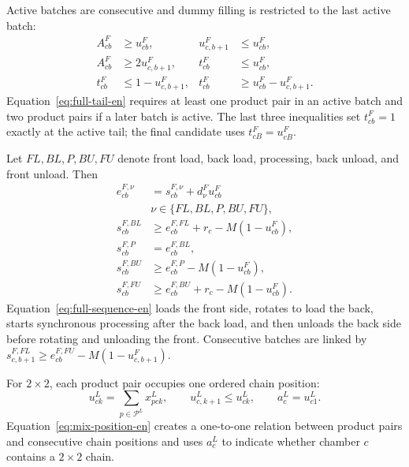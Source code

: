 \documentclass[journal]{IEEEtran}
\begin{document}
Active batches are consecutive and dummy filling is restricted to the last active batch:
\begin{equation}
\begin{aligned}
A^F_{cb}&\ge u^F_{cb}, &u^F_{c,b+1}&\le u^F_{cb},\\
A^F_{cb}&\ge2u^F_{c,b+1},
&t^F_{cb}&\le u^F_{cb},\\
t^F_{cb}&\le1-u^F_{c,b+1},
&t^F_{cb}&\ge u^F_{cb}-u^F_{c,b+1}.
\end{aligned}
\label{eq:full-tail-en}
\end{equation}
Equation~\eqref{eq:full-tail-en} requires at least one product pair in an active batch and two product pairs if a later batch is active. The last three inequalities set $t^F_{cb}=1$ exactly at the active tail; the final candidate uses $t^F_{cB}=u^F_{cB}$.

Let $FL,BL,P,BU,FU$ denote front load, back load, processing, back unload, and front unload. Then
\begin{equation}
\begin{aligned}
e^{F,\nu}_{cb}&=s^{F,\nu}_{cb}+d^{F}_{\nu}u^F_{cb}
\\[-1pt]&\nu\in\{FL,BL,P,BU,FU\},\\
s^{F,BL}_{cb}&\ge e^{F,FL}_{cb}+r_c-M(1-u^F_{cb}),\\
s^{F,P}_{cb}&=e^{F,BL}_{cb},\\
s^{F,BU}_{cb}&\ge e^{F,P}_{cb}-M(1-u^F_{cb}),\\
s^{F,FU}_{cb}&\ge e^{F,BU}_{cb}+r_c-M(1-u^F_{cb}).
\end{aligned}
\label{eq:full-sequence-en}
\end{equation}
Equation~\eqref{eq:full-sequence-en} loads the front side, rotates to load the back, starts synchronous processing after the back load, and then unloads the back side before rotating and unloading the front. Consecutive batches are linked by $s^{F,FL}_{c,b+1}\ge e^{F,FU}_{cb}-M(1-u^F_{c,b+1})$.

For $2\times2$, each product pair occupies one ordered chain position:
\begin{equation}
u^L_{ck}=\sum_{p\in\mathcal P^L}x^L_{pck},\qquad
u^L_{c,k+1}\le u^L_{ck},\qquad
a^L_c=u^L_{c1}.
\label{eq:mix-position-en}
\end{equation}
Equation~\eqref{eq:mix-position-en} creates a one-to-one relation between product pairs and consecutive chain positions and uses $a^L_c$ to indicate whether chamber $c$ contains a $2\times2$ chain.
\end{document}
